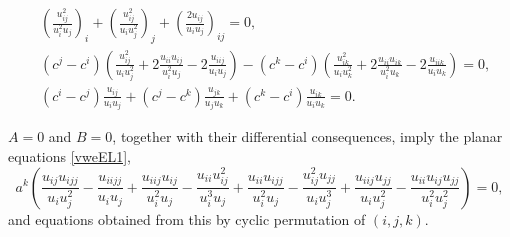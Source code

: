 \documentclass[10pt,a4paper]{amsart}
\begin{document}
	\begin{align}
		&\!\left(\frac{u_{ij}^2}{u_i^2u_j}\right)_i+\left(\frac{u_{ij}^2}{u_iu_j^2}\right)_j+\left(\frac{2u_{ij}}{u_iu_j}\right)_{ij}=0, \label{vweEL1}\\
		&(c^j - c^i) \left( \frac{u_{ij}^2}{u_i u_j^2} + 2 \frac{u_{ii}u_{ij}}{u_i^2 u_j} - 2 \frac{u_{iij}}{u_i u_j}\right)  - (c^k - c^i) \left( \frac{u_{ik}^2}{u_i u_k^2} + 2 \frac{u_{ii}u_{ik}}{u_i^2 u_k} - 2 \frac{u_{iik}}{u_i u_k}\right) = 0,  \label{vweEL2}
		\\
		& (c^i-c^j)\frac{u_{ij}}{u_iu_j}+(c^j-c^k)\frac{u_{jk}}{u_ju_k}+(c^k-c^i)\frac{u_{ik}}{u_iu_k} = 0 . \label{vweEL3}
	\end{align}

\begin{lemma}
	\label{lemma-A2}
	$A = 0$ and $B = 0$, together with their differential consequences, imply the planar equations \eqref{vweEL1},
	\[
	a^{k} {\left(\frac{{u_{ij}} {u_{ijj}}}{{u_{i}} u_{j}^2} - \frac{{u_{iijj}}}{{u_{i}} {u_{j}}} + \frac{{u_{iij}} {u_{ij}}}{u_{i}^2 {u_{j}}} - \frac{{u_{ii}} u_{ij}^2}{u_{i}^3 {u_{j}}} + \frac{{u_{ii}} {u_{ijj}}}{u_{i}^2 {u_{j}}} - \frac{u_{ij}^2 {u_{jj}}}{{u_{i}} u_{j}^3} + \frac{{u_{iij}} {u_{jj}}}{{u_{i}} u_{j}^2} - \frac{{u_{ii}} {u_{ij}} {u_{jj}}}{u_{i}^2 u_{j}^2}\right)} = 0,
	\]
	and equations obtained from this by cyclic permutation of $(i,j,k)$.
\end{lemma}
\end{document}
